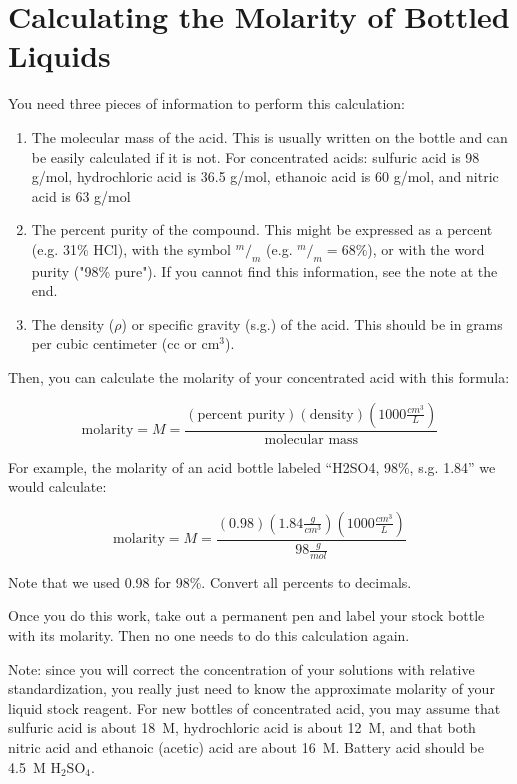 \chapter{Calculating the Molarity of Bottled Liquids}

You need three pieces of information to perform this calculation:

\begin{enumerate}

\item{The molecular mass of the acid. This is usually written on the bottle and can be easily calculated if it is not. For concentrated acids: sulfuric acid is 98 g/mol, hydrochloric acid is 36.5 g/mol, ethanoic acid is 60 g/mol, and nitric acid is 63 g/mol}

\item{The percent purity of the compound. This might be expressed as a percent (e.g. 31\% HCl), with the symbol $ ^m/_m $ (e.g. $ ^m/_m = 68\% $), or with the word purity ("98\% pure"). If you cannot find this information, see the note at the end.}

\item{The density ($\rho$) or specific gravity (s.g.) of the acid. This should be in grams per cubic centimeter (cc or $\mathrm{cm}^3$).}

\end{enumerate}

Then, you can calculate the molarity of your concentrated acid with this formula:

\[ \mathrm{molarity} = M = \frac{(\mathrm{\text{percent purity}})(\mathrm{density})(1000 \frac{cm^3}{L})}{\mathrm{\text{molecular mass}}} \]

For example, the molarity of an acid bottle labeled “H2SO4, 98\%, s.g. 1.84” we would calculate:

\[ \mathrm{molarity} = M = \frac{(0.98)(1.84 \frac{g}{cm^3})(1000 \frac{cm^3}{L})}{98 \frac{g}{mol} }\]

Note that we used 0.98 for 98\%. Convert all percents to decimals.

Once you do this work, take out a permanent pen and label your stock bottle with its molarity. Then no one needs to do this calculation again.

Note: since you will correct the concentration of your solutions with relative standardization, you really just need to know the approximate molarity of your liquid stock reagent. For new bottles of concentrated acid, you may assume that sulfuric acid is about 18~M, hydrochloric acid is about 12~M, and that both nitric acid and ethanoic (acetic) acid are about 16~M. Battery acid should be 4.5~M $ \mathrm{H}_2 \mathrm{SO}_4 $.
